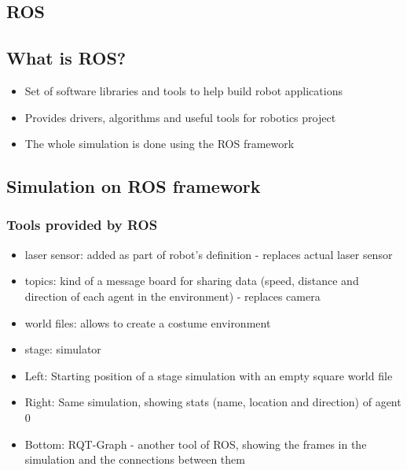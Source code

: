 \documentclass[a0,portrait]{a0poster}
\begin{document}
\begin{multicols}{2}
  \section*{ROS}
  \subsection*{What is ROS?}
  \begin{itemize}
  \item Set of software libraries and tools to help build robot applications
  \item Provides drivers, algorithms and useful tools for robotics project
  \item The whole simulation is done using the ROS framework
  \end{itemize}
  \subsection*{Simulation on ROS framework}
  \subsubsection*{Tools provided by ROS}
  \begin{itemize}
  \item laser sensor: added as part of robot's definition - replaces actual laser sensor
  \item topics: kind of a message board for sharing data (speed, distance and direction of each agent in the environment) - replaces camera
  \item world files: allows to create a costume environment
  \item stage: simulator
  \end{itemize}


  \begin{itemize}
  \item Left: Starting position of a stage simulation with an empty square world file
  \item Right: Same simulation, showing stats (name, location and direction) of agent 0
  \item Bottom: RQT-Graph - another tool of ROS, showing the frames in the simulation and the connections between them
  \end{itemize}





\end{multicols}
\end{document}
